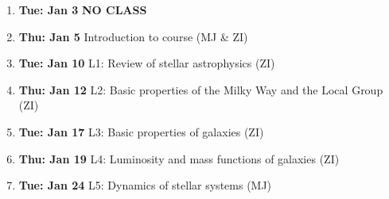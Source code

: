 \documentclass[12pt]{article}
\begin{document}
\vskip 0.2in
\begin{enumerate}
  \item {\bf Tue: Jan 3}  {\bf NO CLASS}
  \item {\bf Thu: Jan 5}   Introduction to course  (MJ \& ZI) 
  \item {\bf Tue: Jan 10}  L1: Review of stellar astrophysics (ZI)
  \item {\bf Thu: Jan 12}  L2: Basic properties of the Milky Way and the Local Group (ZI)
  \item {\bf Tue: Jan 17}  L3: Basic properties of galaxies (ZI)
  \item {\bf Thu: Jan 19}  L4: Luminosity and mass functions of galaxies (ZI)
  \item {\bf Tue: Jan 24}  L5: Dynamics of stellar systems (MJ)


\end{enumerate}
\end{document}
